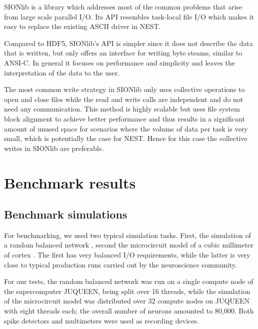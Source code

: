 \documentclass[]{YIC2015}
\begin{document}
SIONlib \cite{frings2009scalable} is a library which addresses most of
the common problems that arise from large scale parallel I/O. Its API
resembles task-local file I/O which makes it easy to replace the
existing ASCII driver in NEST.

Compared to HDF5, SIONlib's API is simpler since it does not describe
the data that is written, but only offers an interface for writing
byte steams, similar to ANSI-C. In general it focuses on performance
and simplicity and leaves the interpretation of the data to the user.

The most common write strategy in SIONlib only uses collective
operations to open and close files while the read and write calls are
independent and do not need any communication. This method is highly
scalable but uses file system block alignment to achieve better
performance and thus results in a significant amount of unused space
for scenarios where the volume of data per task is very small, which
is potentially the case for NEST. Hence for this case the collective
writes in SIONlib are preferable.

\section{Benchmark results}


\subsection{Benchmark simulations}

For benchmarking, we used two typical simulation tasks. First, the
simulation of a random balanced network \cite{morrison07}, second the
microcircuit model of a cubic millimeter of cortex \cite{potjans14}.
The first has very balanced I/O requirements, while the latter is very
close to typical production runs carried out by the neuroscience
community.

For our tests, the random balanced network was run on a single compute
node of the supercomputer JUQUEEN, being split over 16 threads, while
the simulation of the microcircuit model was distributed over 32
compute nodes on JUQUEEN with eight threads each; the overall number
of neurons amounted to 80,000. Both spike detectors and multimeters
were used as recording devices.
\end{document}
